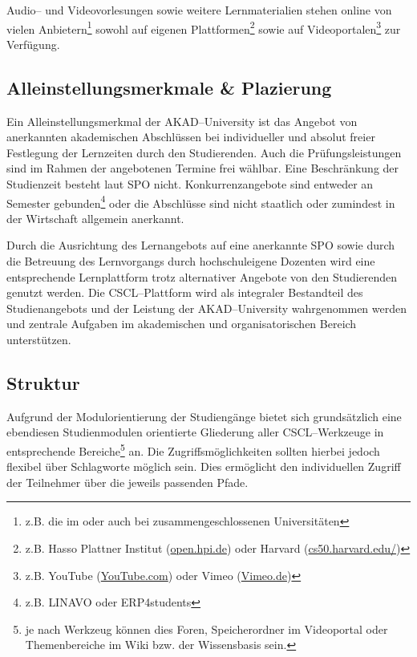 Audio– und Videovorlesungen sowie weitere Lernmaterialien stehen online von vielen Anbietern\footnote{z.B. die im  oder auch bei  zusammengeschlossenen Universitäten} sowohl auf eigenen Plattformen\footnote{z.B. Hasso Plattner Institut (\url{open.hpi.de}) oder Harvard (\url{cs50.harvard.edu/})} sowie auf Videoportalen\footnote{z.B. YouTube (\url{YouTube.com}) oder Vimeo (\url{Vimeo.de})} zur Verfügung.

\subsection{Alleinstellungsmerkmale \& Plazierung} %
\label{sub:alleinstellungsmerkmale_plazierung}
Ein Alleinstellungsmerkmal der AKAD–University ist das Angebot von anerkannten akademischen Abschlüssen bei individueller und absolut freier Festlegung der Lernzeiten durch den Studierenden. Auch die Prüfungsleistungen sind im Rahmen der angebotenen Termine frei wählbar. Eine Beschränkung der Studienzeit besteht laut \ac{SPO} nicht. Konkurrenzangebote sind entweder an Semester gebunden\footnote{z.B. \ac{LINAVO} oder ERP4students} oder die Abschlüsse sind nicht staatlich oder zumindest in der Wirtschaft allgemein anerkannt.

Durch die Ausrichtung des Lernangebots auf eine anerkannte \ac{SPO} sowie durch die Betreuung des Lernvorgangs durch hochschuleigene Dozenten wird eine entsprechende Lernplattform trotz alternativer Angebote von den Studierenden genutzt werden. Die \ac{CSCL}–Plattform wird als integraler Bestandteil des Studienangebots und der Leistung der AKAD–University wahrgenommen werden und zentrale Aufgaben im akademischen und organisatorischen Bereich unterstützen.

\subsection{Struktur} %
\label{sub:struktur}
Aufgrund der Modulorientierung der Studiengänge bietet sich grundsätzlich eine ebendiesen Studienmodulen orientierte Gliederung aller \ac{CSCL}–Werkzeuge in entsprechende Bereiche\footnote{je nach Werkzeug können dies Foren, Speicherordner im Videoportal oder Themenbereiche im Wiki bzw. der Wissensbasis sein.} an. Die Zugriffsmöglichkeiten sollten hierbei jedoch flexibel über Schlagworte möglich sein. Dies ermöglicht den individuellen Zugriff der Teilnehmer über die jeweils passenden Pfade. 

